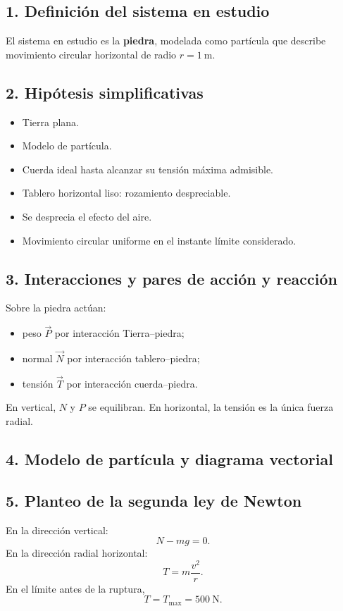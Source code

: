 \documentclass[12pt]{article}
\newcommand{\paso}[2]{%
  \subsection*{\color{AzulFisica}#1. #2}%
}
\begin{document}
\paso{1}{Definición del sistema en estudio}
El sistema en estudio es la \textbf{piedra}, modelada como partícula que describe movimiento circular horizontal de radio $r=\SI{1}{\meter}$.

\paso{2}{Hipótesis simplificativas}
\begin{itemize}[itemsep=2pt]
  \item Tierra plana.
  \item Modelo de partícula.
  \item Cuerda ideal hasta alcanzar su tensión máxima admisible.
  \item Tablero horizontal liso: rozamiento despreciable.
  \item Se desprecia el efecto del aire.
  \item Movimiento circular uniforme en el instante límite considerado.
\end{itemize}

\paso{3}{Interacciones y pares de acción y reacción}
Sobre la piedra actúan:
\begin{itemize}[itemsep=2pt]
  \item peso $\vec P$ por interacción Tierra--piedra;
  \item normal $\vec N$ por interacción tablero--piedra;
  \item tensión $\vec T$ por interacción cuerda--piedra.
\end{itemize}
En vertical, $N$ y $P$ se equilibran. En horizontal, la tensión es la única fuerza radial.

\paso{4}{Modelo de partícula y diagrama vectorial}
\begin{center}
\end{center}

\paso{5}{Planteo de la segunda ley de Newton}
En la dirección vertical:
\[
N-mg=0.
\]
En la dirección radial horizontal:
\[
T=m\frac{v^2}{r}.
\]
En el límite antes de la ruptura,
\[
T=T_{\max}=\SI{500}{\newton}.
\]
\end{document}
